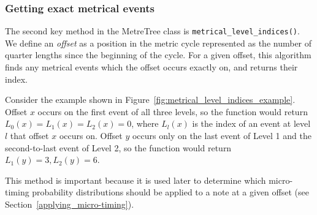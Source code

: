 \documentclass[12pt,twoside,openright]{report}
\begin{document}
\subsubsection{Getting exact metrical events} \label{metrical_level_indices}

The second key method in the MetreTree class is \verb'metrical_level_indices()'. We define an \emph{offset} as a position in the metric cycle represented as the number of quarter lengths since the beginning of the cycle. For a
given offset, this algorithm finds any metrical events
which the offset occurs exactly on, and returns their index.

Consider the example shown in Figure~\ref{fig:metrical_level_indices_example}. Offset $x$
occurs on the first event of all three levels, so the function would return $L_0(x)=L_1(x)=L_2(x)=0$, where $L_l(x)$ is the index of an event at level $l$ that offset $x$ occurs on. Offset $y$ occurs only on the last event of Level 1 and the second-to-last event of Level 2, so the function would return $L_1(y)=3, L_2(y)=6$.

This method is important because it
is used later to determine which micro-timing probability distributions should
be applied to a note at a given offset (see Section~\ref{applying_micro-timing}).
\end{document}
